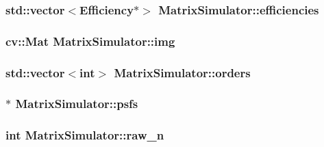 \subsubsection[{\texorpdfstring{efficiencies}{efficiencies}}]{\setlength{\rightskip}{0pt plus 5cm}std\+::vector$<${\bf Efficiency}$\ast$$>$ Matrix\+Simulator\+::efficiencies\hspace{0.3cm}{\ttfamily [private]}}\hypertarget{class_matrix_simulator_a05c00fb5164a5faa987da2642b899035}{}\label{class_matrix_simulator_a05c00fb5164a5faa987da2642b899035}
\subsubsection[{\texorpdfstring{img}{img}}]{\setlength{\rightskip}{0pt plus 5cm}cv\+::\+Mat Matrix\+Simulator\+::img\hspace{0.3cm}{\ttfamily [private]}}\hypertarget{class_matrix_simulator_a90bcc13f784a69c54ad605ef77dcbbe8}{}\label{class_matrix_simulator_a90bcc13f784a69c54ad605ef77dcbbe8}
\subsubsection[{\texorpdfstring{orders}{orders}}]{\setlength{\rightskip}{0pt plus 5cm}std\+::vector$<$int$>$ Matrix\+Simulator\+::orders}\hypertarget{class_matrix_simulator_a5524a9a77d30e2b396737260ec6f73f8}{}\label{class_matrix_simulator_a5524a9a77d30e2b396737260ec6f73f8}
\subsubsection[{\texorpdfstring{psfs}{psfs}}]{$\ast$ Matrix\+Simulator\+::psfs\hspace{0.3cm}{\ttfamily [private]}}\hypertarget{class_matrix_simulator_a4f8b1a0772c43203f1b06420c0d018fa}{}\label{class_matrix_simulator_a4f8b1a0772c43203f1b06420c0d018fa}
\subsubsection[{\texorpdfstring{raw\+\_\+n}{raw_n}}]{\setlength{\rightskip}{0pt plus 5cm}int Matrix\+Simulator\+::raw\+\_\+n}\hypertarget{class_matrix_simulator_a2da306f4e998a609e9a9f26688d80949}{}\label{class_matrix_simulator_a2da306f4e998a609e9a9f26688d80949}
